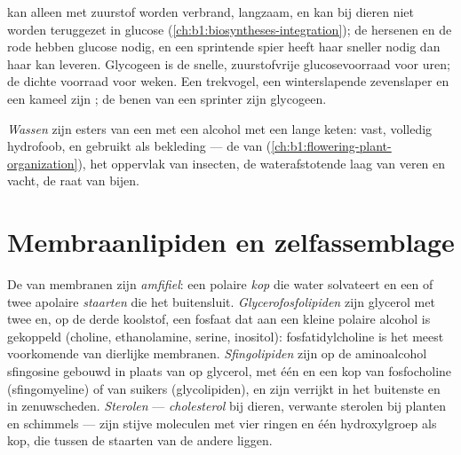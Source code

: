 \begin{example}\label{ex:b1:lipids:whyglycogen}
 kan alleen met zuurstof worden verbrand, langzaam, en kan bij dieren niet
worden teruggezet in glucose (\cref{ch:b1:biosyntheses-integration}); de hersenen
en de rode  hebben glucose nodig, en een sprintende spier heeft haar sneller
nodig dan  haar kan leveren. Glycogeen is de snelle, zuurstofvrije
glucosevoorraad voor uren;  de dichte voorraad voor weken. Een trekvogel, een
winterslapende zevenslaper en een kameel zijn ; de benen van een sprinter zijn
glycogeen.
\end{example}

\begin{definition}[Wassen]\label{def:b1:lipids:wax}
\emph{Wassen} zijn esters van een  met een alcohol met een lange
keten: vast, volledig hydrofoob, en gebruikt als bekleding --- de  van
 (\cref{ch:b1:flowering-plant-organization}), het oppervlak van insecten,
de waterafstotende laag van veren en vacht, de raat van bijen.
\end{definition}

\section{Membraanlipiden en zelfassemblage}

\begin{definition}\label{def:b1:lipids:amphiphilic}
De  van membranen zijn \emph{amfifiel}: een
polaire \emph{kop} die water solvateert en een of twee apolaire \emph{staarten}
die het buitensluit. \emph{Glycerofosfolipiden} zijn glycerol
met twee  en, op de derde koolstof, een fosfaat dat aan een kleine
polaire alcohol is gekoppeld (choline, ethanolamine, serine, inositol):
fosfatidylcholine is het meest voorkomende  van dierlijke membranen.
\emph{Sfingolipiden} zijn op de aminoalcohol sfingosine
gebouwd in plaats van op glycerol, met één  en een kop van fosfocholine
(sfingomyeline) of van suikers (glycolipiden), en zijn verrijkt in het
buitenste  en in zenuwscheden. \emph{Sterolen} ---
\emph{cholesterol} bij dieren, verwante sterolen bij planten en
schimmels --- zijn stijve moleculen met vier ringen en één hydroxylgroep als kop,
die tussen de staarten van de andere  liggen.
\end{definition}

